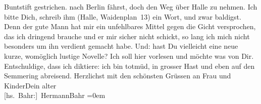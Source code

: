 \begin{ledgroupsized}[t]{13cm}
{{{                  Buntstift gestrichen.}}}\label{T_L01897_1h} nach Berlin fährst,
               doch den Weg über Halle zu nehmen. Ich bitte Dich,
               schreib ihm (Halle, Waidenplan 13) ein Wort, und
               zwar baldigst. Denn der gute Mann {\pb}hat mir ein
               unfehlbares Mittel gegen die Gicht versprochen, das ich dringend brauche und er mir
               sicher nicht schickt, so lang ich mich nicht besonders um ihn verdient gemacht habe.
               Und: hast Du vielleicht eine neue kurze, womöglich lustige Novelle? Ich soll hier
                  \label{K_L01897_1v}\label{K_L01897_1h} vorlesen und möchte was von Dir. Entschuldige, dass
               ich diktiere: ich bin totmüd, in grosser Hast und eben auf den Semmering abreisend.\pend
           \pstart
           Herzlichst mit den schönsten Grüssen an Frau und KinderDein alter{\\[\baselineskip]}\spacefill\mbox{{[}hs. Bahr:{]} HermannBahr}\pend
           \leftskip=0em{}\endnumbering{}\end{ledgroupsized}  \newcommand{\dateiname}{L01897}\newcommand{\titel}{Hermann Bahr an Arthur Schnitzler, 11. 12. 1909}\newcommand{\editorInnen}{ Kurt Ifkovits,  Martin Anton Müller}
            \footnotesize
\begin{ledgroupsized}[t]{11.5cm}
\end{ledgroupsized}
         
      